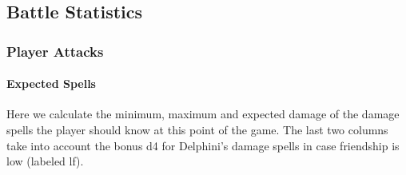 \subsection{Battle Statistics}

\subsubsection{Player Attacks}
\paragraph{Expected Spells} Here we calculate the minimum, maximum and expected damage of the damage spells the player should know at this point of the game. The last two columns take into account the bonus d4 for Delphini's damage spells in case friendship is low (labeled lf).

